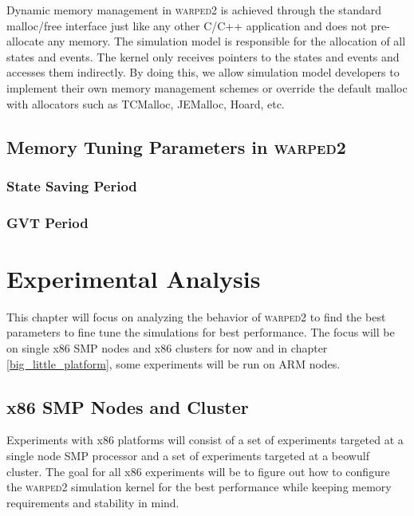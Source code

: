 \documentclass[11pt]{book}
\begin{document}
Dynamic memory management in \textsc{warped2} is achieved through the standard malloc/free
interface just like any other C/C++ application and does not pre-allocate any memory. The
simulation model is responsible for the allocation of all states and events. The kernel only
receives pointers to the states and events and accesses them indirectly. By doing this, we
allow simulation model developers to implement their own memory management schemes or override
the default malloc with allocators such as TCMalloc, JEMalloc, Hoard, etc.


\section{Memory Tuning Parameters in \textsc{warped2}}



\subsection{State Saving Period}



\subsection{GVT Period}





\chapter{Experimental Analysis}\label{experimental_analysis}

This chapter will focus on analyzing the behavior of \textsc{warped2} to find the best parameters
to fine tune the simulations for best performance. The focus will be on single x86 SMP nodes
and x86 clusters for now and in chapter \ref{big_little_platform}, some experiments will be
run on ARM nodes.

\section{x86 SMP Nodes and Cluster}

Experiments with x86 platforms will consist of a set of experiments targeted at a single node
SMP processor and a set of experiments targeted at a beowulf cluster. The goal for all x86
experiments will be to figure out how to configure the \textsc{warped2} simulation kernel for
the best performance while keeping memory requirements and stability in mind.
\end{document}

